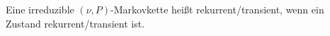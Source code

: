 Eine irreduzible $(\nu,P)$-Markovkette heißt rekurrent/transient, wenn ein Zustand rekurrent/transient ist.